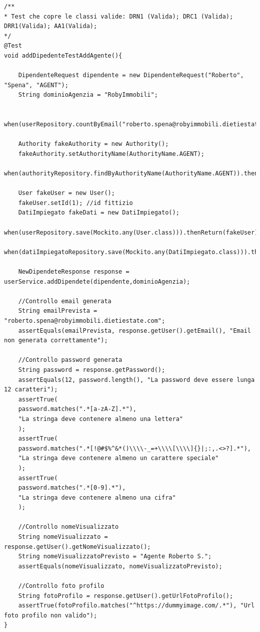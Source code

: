 \begin{lstlisting}
/**
* Test che copre le classi valide: DRN1 (Valida); DRC1 (Valida); DRR1(Valida); AA1(Valida);
*/
@Test
void addDipedenteTestAddAgente(){
	
	DipendenteRequest dipendente = new DipendenteRequest("Roberto", "Spena", "AGENT");
	String dominioAgenzia = "RobyImmobili";
	
	when(userRepository.countByEmail("roberto.spena@robyimmobili.dietiestate.com")).thenReturn(0);
	
	Authority fakeAuthority = new Authority();
	fakeAuthority.setAuthorityName(AuthorityName.AGENT);
	when(authorityRepository.findByAuthorityName(AuthorityName.AGENT)).thenReturn(Optional.of(fakeAuthority));
	
	User fakeUser = new User();
	fakeUser.setId(1); //id fittizio
	DatiImpiegato fakeDati = new DatiImpiegato();
	when(userRepository.save(Mockito.any(User.class))).thenReturn(fakeUser);
	when(datiImpiegatoRepository.save(Mockito.any(DatiImpiegato.class))).thenReturn(fakeDati);
	
	NewDipendeteResponse response = userService.addDipendete(dipendente,dominioAgenzia);
	
	//Controllo email generata
	String emailPrevista = "roberto.spena@robyimmobili.dietiestate.com";
	assertEquals(emailPrevista, response.getUser().getEmail(), "Email non generata correttamente");
	
	//Controllo password generata
	String password = response.getPassword();
	assertEquals(12, password.length(), "La password deve essere lunga 12 caratteri");
	assertTrue(
	password.matches(".*[a-zA-Z].*"),
	"La stringa deve contenere almeno una lettera"
	);
	assertTrue(
	password.matches(".*[!@#$%^&*()\\\\-_=+\\\\[\\\\]{}|;:,.<>?].*"),
	"La stringa deve contenere almeno un carattere speciale"
	);
	assertTrue(
	password.matches(".*[0-9].*"),
	"La stringa deve contenere almeno una cifra"
	);
	
	//Controllo nomeVisualizzato
	String nomeVisualizzato = response.getUser().getNomeVisualizzato();
	String nomeVisualizzatoPrevisto = "Agente Roberto S.";
	assertEquals(nomeVisualizzato, nomeVisualizzatoPrevisto);
	
	//Controllo foto profilo
	String fotoProfilo = response.getUser().getUrlFotoProfilo();
	assertTrue(fotoProfilo.matches("^https://dummyimage.com/.*"), "Url foto profilo non valido");
}
\end{lstlisting}

